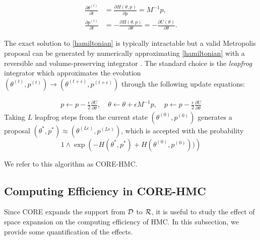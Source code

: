 \documentclass[10pt,fleqn]{article} \pdfoutput=1
\DeclareMathOperator{\1}{\mathbbm{1}} \DeclareMathOperator{\bigO}{\mc O}
\newcommand{\dt}{\epsilon} %
\newcommand{\mass}{M} %
\begin{document}
\begin{equation} \begin{aligned} \label{hamiltonian} \frac{\partial \theta
		^{(t)}}{\partial t} & =\frac{\partial H(\theta, p)}{\partial p} =
		\mass^{-1}p,                                                 \\ \frac{\partial p^{(t)}}{\partial t}&
		=-\frac{\partial H(\theta, p)}{\partial \theta} = -\frac{\partial
			U(\theta)}{\partial \theta}.\end{aligned} \end{equation}

The exact solution to \eqref{hamiltonian} is typically intractable but a
valid Metropolis proposal can be generated by numerically approximating
\eqref{hamiltonian} with a reversible and volume-preserving  integrator
\citep{neal2011mcmc}. The standard choice is the \textit{leapfrog}
integrator which approximates the evolution $(\theta^{(t)},p^{(t)}) \to (\theta^{(t +
			\dt)},p^{(t + \dt)})$ through the following update equations:

\begin{equation} \begin{aligned} \label{leap-frog} 
p \leftarrow p -
		\frac{\dt}{2} \frac{\partial U}{\partial  \theta },\quad \theta \leftarrow  \theta
		+ \dt \mass^{-1}p,\quad p \leftarrow p -  \frac{\dt}{2}
		\frac{\partial U}{\partial  \theta }\end{aligned} \end{equation} Taking
$L$ leapfrog steps from the current state $(\theta^{(0)},p^{(0)})$
generates a proposal $(\theta^{*},p^{*}) \approx (\theta^{(L \dt)},p^{(L
	\dt)})$, which is accepted with the probability $$1\wedge \exp
	\left( - H(\theta^{*},p^{*}) + H(\theta^{(0)},p^{(0)}))\right)$$

We refer to this algorithm as CORE-HMC.

\subsection{Computing Efficiency in CORE-HMC}

Since CORE expands the support from $\mathcal{D}$ to $\mathcal{R}$, it is useful to
study the effect of space expansion on the computing efficiency of HMC. In this
subsection, we provide some  quantification of the effects.
\end{document}
